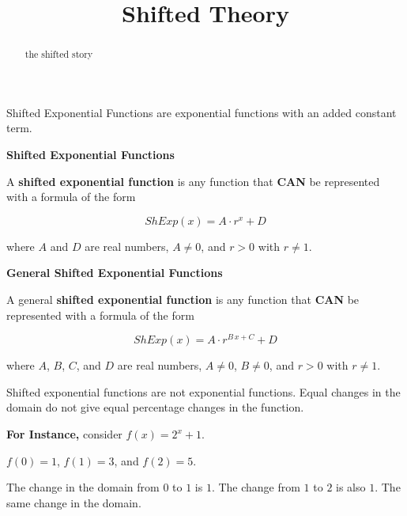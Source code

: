 \documentclass{ximera}
\title{Shifted Theory}
\begin{document}
\begin{abstract}
the shifted story
\end{abstract}
\maketitle






Shifted Exponential Functions are exponential functions with an added constant term.






\begin{definition} \textbf{\textcolor{green!50!black}{Shifted Exponential Functions}}

A \textbf{shifted exponential function} is any function that \textbf{\textcolor{purple!85!blue}{CAN}} be represented with a formula of the form

\[     ShExp(x) =    A \cdot r^x  + D         \]

where $A$ and $D$ are real numbers, $A \ne 0$, and $r > 0$ with $r \ne 1$.


\end{definition}






\begin{definition} \textbf{\textcolor{green!50!black}{General Shifted Exponential Functions}}

A general \textbf{shifted exponential function} is any function that \textbf{\textcolor{purple!85!blue}{CAN}} be represented with a formula of the form

\[     ShExp(x) =    A \cdot r^{B \, x + C}  + D         \]

where $A$, $B$, $C$, and $D$ are real numbers, $A \ne 0$, $B \ne 0$, and $r > 0$ with $r \ne 1$.


\end{definition}




Shifted exponential functions are not exponential functions.  Equal changes in the domain do not give equal percentage changes in the function. 



\textbf{For Instance,} consider $f(x) = 2^{x} + 1$. 


$f(0) = 1$, $f(1) = 3$, and $f(2) = 5$. 

The change in the domain from $0$ to $1$ is $1$.  The change from $1$ to $2$ is also $1$. The same change in the domain.
\end{document}

